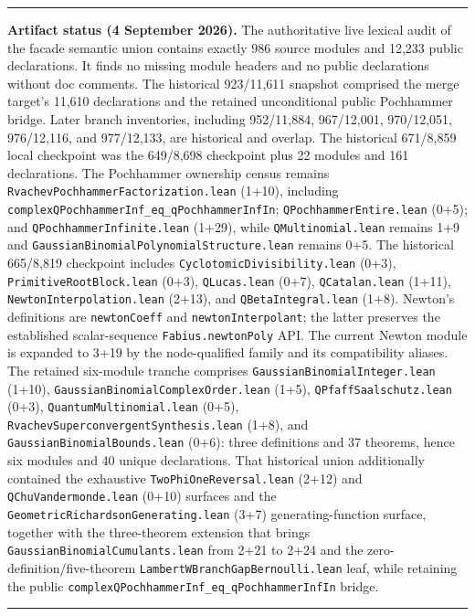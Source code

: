 \documentclass[11pt,oneside]{article}
\theoremstyle{definition}
\theoremstyle{remark}
\newenvironment{boxedremark}{%
  \par\smallskip\noindent\begin{center}\begin{minipage}{0.94\textwidth}%
  \color{black}\hrule\vspace{0.6em}\small
}{%
  \vspace{0.6em}\hrule\end{minipage}\end{center}\smallskip
}
\begin{document}
\begin{boxedremark}\textbf{Artifact status (4 September 2026).}\space
The authoritative live lexical audit of the facade semantic union contains
exactly 986 source modules and 12,233 public declarations.  It finds no
missing module headers and no public declarations without doc comments.  The
historical 923/11,611 snapshot comprised the merge target's 11,610
declarations and the retained unconditional public Pochhammer bridge.  Later
branch inventories, including 952/11,884, 967/12,001, 970/12,051,
976/12,116, and 977/12,133, are historical and overlap.  The
historical 671/8,859 local checkpoint was the 649/8,698 checkpoint plus 22
modules and 161 declarations.  The
Pochhammer ownership census remains
\nolinkurl{RvachevPochhammerFactorization.lean} (1+10), including
\nolinkurl{complexQPochhammerInf_eq_qPochhammerInfIn};
\nolinkurl{QPochhammerEntire.lean} (0+5); and
\nolinkurl{QPochhammerInfinite.lean} (1+29), while
\nolinkurl{QMultinomial.lean} remains 1+9 and
\nolinkurl{GaussianBinomialPolynomialStructure.lean} remains 0+5.
The historical 665/8,819 checkpoint includes
\nolinkurl{CyclotomicDivisibility.lean} (0+3),
\nolinkurl{PrimitiveRootBlock.lean} (0+3), \nolinkurl{QLucas.lean} (0+7),
\nolinkurl{QCatalan.lean} (1+11), \nolinkurl{NewtonInterpolation.lean} (2+13),
and \nolinkurl{QBetaIntegral.lean} (1+8).  Newton's definitions are
\nolinkurl{newtonCoeff} and \nolinkurl{newtonInterpolant}; the latter preserves
the established scalar-sequence \nolinkurl{Fabius.newtonPoly} API.
The current Newton module is expanded to 3+19 by the node-qualified family and
its compatibility aliases.  The retained six-module tranche comprises
\nolinkurl{GaussianBinomialInteger.lean} (1+10),
\nolinkurl{GaussianBinomialComplexOrder.lean} (1+5),
\nolinkurl{QPfaffSaalschutz.lean} (0+3),
\nolinkurl{QuantumMultinomial.lean} (0+5),
\nolinkurl{RvachevSuperconvergentSynthesis.lean} (1+8), and
\nolinkurl{GaussianBinomialBounds.lean} (0+6): three definitions and 37
theorems, hence six modules and 40 unique declarations.
That historical union additionally contained the exhaustive
\nolinkurl{TwoPhiOneReversal.lean} (2+12) and
\nolinkurl{QChuVandermonde.lean} (0+10) surfaces and the
\nolinkurl{GeometricRichardsonGenerating.lean} (3+7) generating-function
surface, together with the three-theorem extension that brings
\nolinkurl{GaussianBinomialCumulants.lean} from 2+21 to 2+24 and the
zero-definition/five-theorem
\nolinkurl{LambertWBranchGapBernoulli.lean} leaf, while retaining the public
\nolinkurl{complexQPochhammerInf_eq_qPochhammerInfIn} bridge.

\end{boxedremark}
\end{document}
